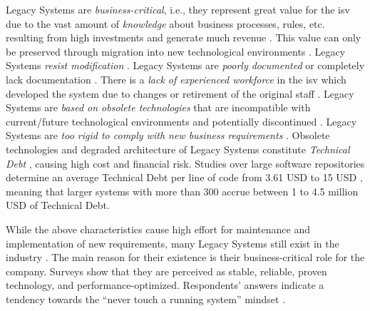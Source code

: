 \glspl{Legacy System} are \emph{business-critical}, i.e., they represent great value for the \gls{isv} due to the vast amount of \emph{knowledge} about business processes, rules, etc. \autocite{Aversano2001,Sneed2010SoftwareMigration,Wagner2014} resulting from high investments \autocite{Lucia2009METAMORPHOS} and generate much revenue  \autocite[``cash cows''][]{Khadka2014ProfessionalsModernization}.
This value can only be preserved through migration into new technological environments \autocite{Fuhr2013SOAMIG}.
\glspl{Legacy System} \emph{resist modification}  \autocite{Bisbal1999LegacyInformationSystems}.
\glspl{Legacy System} are \emph{poorly documented} or completely lack documentation \autocite{Sneed2010SoftwareMigration,warren2012renaissance,Batlajery2014IndustrialSurveyModernization,Lucia2008}.
There is a \emph{lack of experienced workforce} in the \gls{isv} which developed the system \autocite{Batlajery2014IndustrialSurveyModernization} due to changes or retirement of the original staff \autocite{Lucia2008}.
\glspl{Legacy System} are \emph{based on obsolete technologies} that are incompatible with current/future technological environments and potentially discontinued \autocite{Perez-Castillo2013PRECISO,Batlajery2014IndustrialSurveyModernization,Heil2016AWSM}.
\glspl{Legacy System} are \emph{too rigid to comply with new business requirements} \autocite{Batlajery2014IndustrialSurveyModernization}.
Obsolete technologies \autocite{Yli-Huumo2016TD} and degraded architecture \autocite{Li2015TDSMS} of \glspl{Legacy System} constitute \emph{\gls{Technical Debt}} \autocite{Cunningham1992TD,Avgeriou2016TD}, causing high cost and financial risk.
Studies over large software repositories determine an average \gls{Technical Debt} per line of code from 3.61 USD \autocite{CAST2011} to 15 USD \autocite{Curtis2012EstimatingTD}, meaning that larger systems with more than 300  accrue between 1 to 4.5 million USD of \gls{Technical Debt}.

While the above characteristics cause high effort for maintenance and implementation of new requirements, many \glspl{Legacy System} still exist in the industry \autocite{Fuhr2013SOAMIG}.
The main reason for their existence is their business-critical role for the company.
Surveys \autocite{Khadka2014ProfessionalsModernization,Batlajery2014IndustrialSurveyModernization} show that they are perceived as stable, reliable, proven technology, and performance-optimized.
Respondents' answers indicate a tendency towards the ``never touch a running system'' mindset \autocite{Batlajery2014IndustrialSurveyModernization}.

